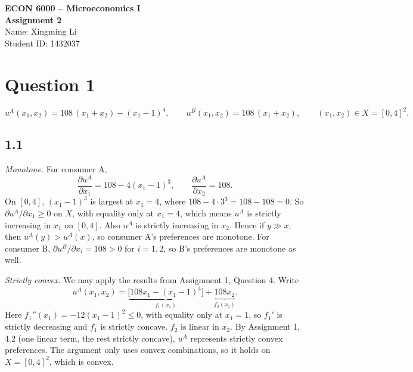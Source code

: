 \documentclass[12pt,letterpaper]{article}
\newif\ifshowhints
\newcommand{\hint}[1]{\ifshowhints{\color{blue}\small\textbf{Hint.} #1\par}\fi}
\begin{document}
\begin{center}
  {\large\bfseries ECON 6000 -- Microeconomics I}\\[4pt]
  {\large\bfseries Assignment 2}\\[10pt]
  Name: Xingming Li\\
  Student ID: 1432037
\end{center}

\vspace{6pt}

\section*{Question 1}

\[
u^A(x_1,x_2) = 108\,(x_1+x_2) - (x_1-1)^4, \qquad u^B(x_1,x_2) = 108\,(x_1+x_2), \qquad (x_1,x_2)\in X=[0,4]^2 .
\]

\subsection*{1.1}

\hint{Monotone: compute $\partial u^A/\partial x_1 = 108 - 4(x_1-1)^3$ and find its smallest value on $[0,4]$. Why is the constant $108$ chosen? $u^B$ is immediate.
Strictly convex: $u^A$ is additively separable, $u^A = f_1(x_1)+f_2(x_2)$ with $f_1$ strictly concave and $f_2$ linear. This is the first case of Assignment 1, 4.2. $u^B$ is linear, so look for a counterexample as in the second case of 4.2.}

\textit{Monotone.} For consumer A,
\[
\frac{\partial u^A}{\partial x_1} = 108 - 4(x_1-1)^3, \qquad \frac{\partial u^A}{\partial x_2} = 108 .
\]
On $[0,4]$, $(x_1-1)^3$ is largest at $x_1=4$, where $108-4\cdot 3^3 = 108-108 = 0$. So $\partial u^A/\partial x_1 \ge 0$ on $X$, with equality only at $x_1=4$, which means $u^A$ is strictly increasing in $x_1$ on $[0,4]$. Also $u^A$ is strictly increasing in $x_2$. Hence if $y\gg x$, then $u^A(y)>u^A(x)$, so consumer A's preferences are monotone. For consumer B, $\partial u^B/\partial x_i = 108>0$ for $i=1,2$, so B's preferences are monotone as well.

\textit{Strictly convex.} We may apply the results from Assignment 1, Question 4. Write
\[
u^A(x_1,x_2) = \underbrace{\big[108x_1 - (x_1-1)^4\big]}_{f_1(x_1)} + \underbrace{108x_2}_{f_2(x_2)} .
\]
Here $f_1''(x_1) = -12(x_1-1)^2 \le 0$, with equality only at $x_1=1$, so $f_1'$ is strictly decreasing and $f_1$ is strictly concave. $f_2$ is linear in $x_2$. By Assignment 1, 4.2 (one linear term, the rest strictly concave), $u^A$ represents strictly convex preferences. The argument only uses convex combinations, so it holds on $X=[0,4]^2$, which is convex.
\end{document}
